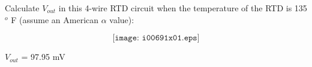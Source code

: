 

Calculate $V_{out}$ in this 4-wire RTD circuit when the temperature of the RTD is 135$^{o}$ F (assume an American $\alpha$ value):

$$\texttt{[image: i00691x01.eps]}$$







$V_{out}$ = 97.95 mV











